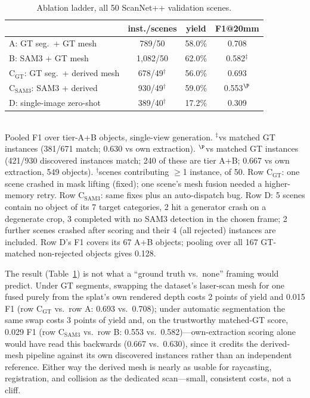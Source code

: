\begin{table}[t]
\caption{Ablation ladder, all 50 ScanNet++ validation scenes.}
\label{tab:ladder}
\centering\small\setlength{\tabcolsep}{4pt}
\begin{tabular}{@{}lccc@{}}
\toprule
 & inst./scenes & yield & F1@20mm \\
\midrule
A: GT seg.\ + GT mesh & 789/50 & 58.0\% & 0.708 \\
B: SAM3 + GT mesh & 1{,}082/50 & 62.0\% & 0.582$^\ddagger$ \\
C$_{\text{GT}}$: GT seg.\ + derived mesh & 678/49$^\dagger$ & 56.0\% & 0.693 \\
C$_{\text{SAM3}}$: SAM3 + derived & 930/49$^\dagger$ & 59.0\% & 0.553$^\P$ \\
D: single-image zero-shot & 389/40$^\dagger$ & 17.2\% & 0.309 \\
\bottomrule
\end{tabular}\\[2pt]
{\footnotesize Pooled F1 over tier-A+B objects, single-view generation.
$^\ddagger$vs matched GT instances (381/671 match; 0.630 vs own
extraction). $^\P$vs matched GT instances (421/930 discovered instances
match; 240 of these are tier A+B; 0.667 vs own extraction, 549 objects).
$^\dagger$scenes contributing $\geq$1 instance, of
50. Row C$_{\text{GT}}$: one scene crashed in mask lifting (fixed); one
scene's mesh fusion needed a higher-memory retry. Row C$_{\text{SAM3}}$:
same fixes plus an auto-dispatch bug.
Row D: 5 scenes contain no object of its 7 target categories, 2 hit a
generator crash on a degenerate crop, 3 completed with no SAM3
detection in the chosen frame; 2 further scenes crashed after scoring
and their 4 (all rejected) instances are included. Row D's F1 covers
its 67 A+B objects; pooling over all 167 GT-matched non-rejected
objects gives 0.128.}
\end{table}

The result (Table~\ref{tab:ladder}) is not what a ``ground truth vs.\
none'' framing would predict. Under GT segments, swapping the dataset's
laser-scan mesh for one fused purely from the splat's own rendered depth
costs 2 points of yield and 0.015 F1 (row C$_{\text{GT}}$ vs.\ row A:
0.693 vs.\ 0.708); under automatic segmentation the same swap costs 3
points of yield and, on the trustworthy matched-GT score, 0.029 F1 (row
C$_{\text{SAM3}}$ vs.\ row B: 0.553 vs.\ 0.582)---own-extraction scoring
alone would have read this backwards (0.667 vs.\ 0.630), since it
credits the derived-mesh pipeline against its own discovered instances
rather than an independent reference. Either way the derived mesh is
nearly as usable for raycasting, registration, and collision as the
dedicated scan---small, consistent costs, not a cliff.

